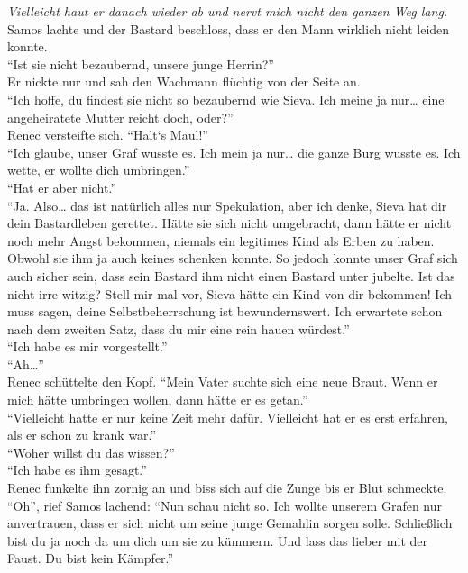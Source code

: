 \textit{Vielleicht haut er danach wieder ab und nervt mich nicht den ganzen Weg lang.}\\
Samos lachte und der Bastard beschloss, dass er den Mann wirklich nicht leiden konnte.\\
``Ist sie nicht bezaubernd, unsere junge Herrin?''\\
Er nickte nur und sah den Wachmann flüchtig von der Seite an.\\
``Ich hoffe, du findest sie nicht so bezaubernd wie Sieva. Ich meine ja nur… eine angeheiratete 
Mutter reicht doch, oder?''\\
Renec versteifte sich. ``Halt‘s Maul!''\\
``Ich glaube, unser Graf wusste es. Ich mein ja nur… die ganze Burg wusste es. Ich wette, er wollte 
dich umbringen.''\\
``Hat er aber nicht.''\\
``Ja. Also… das ist natürlich alles nur Spekulation, aber ich denke, Sieva hat dir dein 
Bastardleben gerettet. Hätte sie sich nicht umgebracht, dann hätte er nicht noch mehr Angst 
bekommen, niemals ein legitimes Kind als Erben zu haben. Obwohl sie ihm ja auch keines schenken 
konnte. So jedoch konnte unser Graf sich auch sicher sein, dass sein Bastard ihm nicht einen 
Bastard unter jubelte. Ist das nicht irre witzig? Stell mir mal vor, Sieva hätte ein Kind von dir 
bekommen! Ich muss sagen, deine Selbstbeherrschung ist bewundernswert. Ich erwartete schon nach dem 
zweiten Satz, dass du mir eine rein hauen würdest.''\\
``Ich habe es mir vorgestellt.''\\
``Ah…''\\
Renec schüttelte den Kopf. ``Mein Vater suchte sich eine neue Braut. Wenn er mich hätte umbringen 
wollen, dann hätte er es getan.''\\
``Vielleicht hatte er nur keine Zeit mehr dafür. Vielleicht hat er es erst erfahren, als er schon 
zu krank war.''\\
``Woher willst du das wissen?''\\
``Ich habe es ihm gesagt.''\\
Renec funkelte ihn zornig an und biss sich auf die Zunge bis er Blut schmeckte.\\
``Oh'', rief Samos lachend: ``Nun schau nicht so. Ich wollte unserem Grafen nur anvertrauen, dass 
er sich nicht um seine junge Gemahlin sorgen solle. Schließlich bist du ja noch da um dich um sie 
zu kümmern. Und lass das lieber mit der Faust. Du bist kein Kämpfer.''\\
